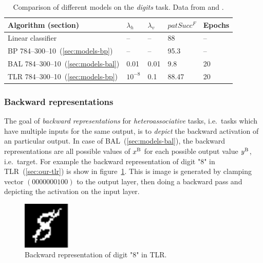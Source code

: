 \begin{table}[H] 
  \centering
    \begin{tabular}{|l|l|l|l|l|}
    \hline
    Algorithm (section)&$\lambda_h$&$\lambda_v$&$patSucc^F$ &Epochs\\ %
    \hline
    Linear classifier & -- & -- & 88 & -- \\ 
    \hline
    BP 784--300--10~(\ref{sec:models-bp})& -- & -- & 95.3 & -- \\ 
    \hline 
    BAL 784--300--10~(\ref{sec:models-bal})& 0.01 & 0.01 & 9.8 & 20 \\
    \hline 
    TLR 784--300--10~(\ref{sec:models-bp})& $10^{-8}$ & 0.1 & 88.47 & 20 \\
    \hline 
    \end{tabular}
  \caption{Comparison of different models on the \emph{digits} task. Data from \citet{lecun1998gradient} and \citet{digits2014mnist}.} 
  \label{tab:results-cmp-digits}
\end{table}

\subsubsection{Backward representations} 
\label{sec:our-backward-repre}

The goal of \emph{backward representations} for \emph{heteroassociative} tasks, i.e.~tasks which have multiple inputs for the same output, is to \emph{depict} the backward activation of an particular output. In case of BAL~(\ref{sec:models-bal}), the backward representations are all possible values of $x^{\rm B}$ for each possible output value $y^{\rm B}$, i.e.~target. For example the backward representation of digit "8" in TLR~(\ref{sec:our-tlr}) is show in figure~\ref{fig:our-backward-repre-8}. This is image is generated by clamping vector $(0000000100)$ to the output layer, then doing a backward pass and depicting the activation on the input layer. 

\begin{figure}[H]
  \centering
  \includegraphics[width=0.2\textwidth]{img/tlr-digit-8.png} 
  \caption{Backward representation of digit "8" in TLR.}
  \label{fig:our-backward-repre-8}
\end{figure}

